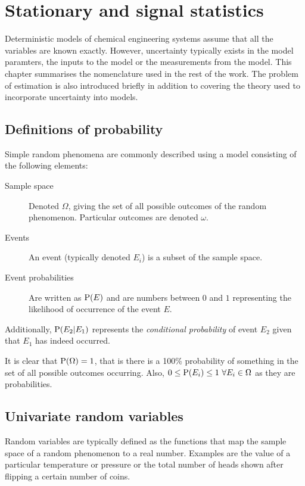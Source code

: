 \chapter{Stationary and signal statistics}\label{chap:stats}
\begin{overview} 
  Deterministic models of chemical engineering systems assume that all the variables are known exactly.
  However, uncertainty typically exists in the model paramters, the inputs to the model or the measurements from the model.
  This chapter summarises the nomenclature used in the rest of the work.
  The problem of estimation is also introduced briefly in addition to covering the theory used to incorporate uncertainty into models.
\end{overview}

\section{Definitions of probability}
\label{sec:statistisc:probability}
Simple random phenomena are commonly described using a model consisting of the following elements:\citep[1]{kulkarni1999modeling}
\begin{description}
\item[Sample space] Denoted $\Omega$, giving the set of all possible outcomes of the random phenomenon.  
  Particular outcomes are denoted $\omega$.
\item[Events] An event (typically denoted $E_i$) is a subset of the sample space.
\item[Event probabilities] Are written as $\mathrm{P}(E)$ and are numbers between $0$ and $1$ representing the likelihood of occurrence of the event $E$.
\end{description}

Additionally, $\mathrm{P}(E_2|E_1)$  represents the \emph{conditional probability} of event $E_2$ given that $E_1$ has indeed occurred.

It is clear that $\mathrm{P}(\Omega)=1$, that is there is a 100\% probability of something in the set of all possible outcomes occurring.
Also, $0 \leq \mathrm{P}(E_i) \leq 1 ~\forall E_i \in \Omega$ as they are probabilities.

\section{Univariate random variables}
\label{sec:univ-rand-vari}
Random variables are typically defined as the functions that map the sample space of a random phenomenon to a real number.
Examples are the value of a particular temperature or pressure or the total number of heads shown after flipping a certain number of coins.

